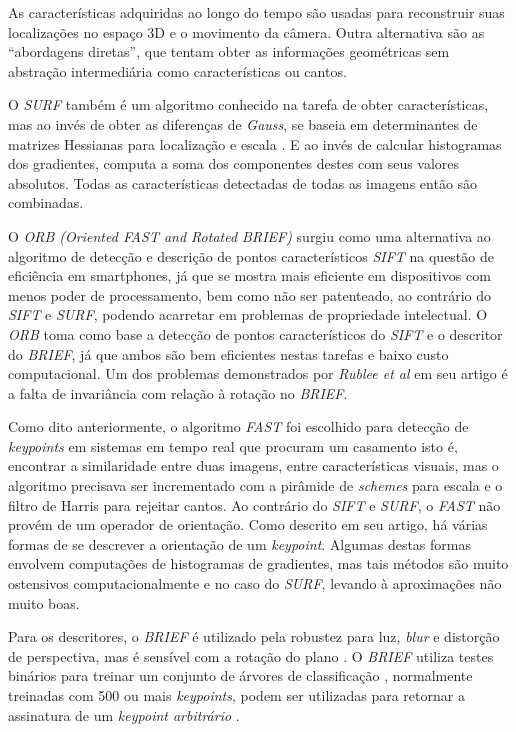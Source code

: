   As características adquiridas ao longo do tempo são usadas para reconstruir suas localizações no espaço 3D e o movimento da câmera. Outra alternativa são as “abordagens diretas”, que tentam obter as informações geométricas sem abstração intermediária como características ou cantos.

O \textit{SURF}\cite{SURF} também é um algoritmo conhecido na tarefa de obter características, mas ao invés de obter as diferenças de \textit{Gauss}, se baseia em determinantes de matrizes Hessianas para localização e escala \cite{Hessian}. E ao invés de calcular histogramas dos gradientes, computa a soma dos componentes destes com seus valores absolutos. Todas as características detectadas de todas as imagens então são combinadas.

O \textit{ORB (Oriented FAST and Rotated BRIEF)} surgiu como uma alternativa ao algoritmo de detecção e descrição de pontos característicos \textit{SIFT} na questão de eficiência em smartphones, já que se mostra mais eficiente em dispositivos com menos poder de processamento, bem como não ser patenteado, ao contrário do \textit{SIFT} e \textit{SURF}, podendo acarretar em problemas de propriedade intelectual. O \textit{ORB} toma como base a detecção de pontos característicos do \textit{SIFT} e o descritor do \textit{BRIEF}, já que ambos são bem eficientes nestas tarefas e baixo custo computacional. Um dos problemas demonstrados por \textit{Rublee et al}\cite{ORB-Artigo} em seu artigo é a falta de invariância com relação à rotação no \textit{BRIEF}.

Como dito anteriormente, o algoritmo \textit{FAST} foi escolhido para detecção de \textit{keypoints} em sistemas em tempo real que procuram um casamento isto é, encontrar a similaridade entre duas imagens, entre características visuais, mas o algoritmo precisava ser incrementado com a pirâmide de \textit{schemes} para escala\cite{ORB-Artigo} e o filtro de Harris\cite{ORB-Artigo} para rejeitar cantos. Ao contrário do \textit{SIFT} e \textit{SURF}, o \textit{FAST} não provém de um operador de orientação. Como descrito em seu artigo, há várias formas de se descrever a orientação de um \textit{keypoint}. Algumas destas formas envolvem computações de histogramas de gradientes, mas tais métodos são muito ostensivos computacionalmente e no caso do \textit{SURF}, levando à aproximações não muito boas.

Para os descritores, o \textit{BRIEF} é utilizado pela robustez para luz, \textit{blur} e distorção de perspectiva, mas é sensível com a rotação do plano \cite{ORB-Artigo}. O \textit{BRIEF} utiliza testes binários para treinar um conjunto de árvores de classificação \cite{ORB-Artigo}, normalmente treinadas com 500 ou mais \textit{keypoints}, podem ser utilizadas para retornar a assinatura de um \textit{keypoint arbitrário} \cite{ORB-Artigo}.

